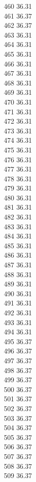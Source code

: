 460	36.31\\
461	36.37\\
462	36.37\\
463	36.31\\
464	36.31\\
465	36.31\\
466	36.31\\
467	36.31\\
468	36.31\\
469	36.31\\
470	36.31\\
471	36.31\\
472	36.31\\
473	36.31\\
474	36.31\\
475	36.31\\
476	36.31\\
477	36.31\\
478	36.31\\
479	36.31\\
480	36.31\\
481	36.31\\
482	36.31\\
483	36.31\\
484	36.31\\
485	36.31\\
486	36.31\\
487	36.31\\
488	36.31\\
489	36.31\\
490	36.31\\
491	36.31\\
492	36.31\\
493	36.31\\
494	36.31\\
495	36.37\\
496	36.37\\
497	36.37\\
498	36.37\\
499	36.37\\
500	36.37\\
501	36.37\\
502	36.37\\
503	36.37\\
504	36.37\\
505	36.37\\
506	36.37\\
507	36.37\\
508	36.37\\
509	36.37\\
